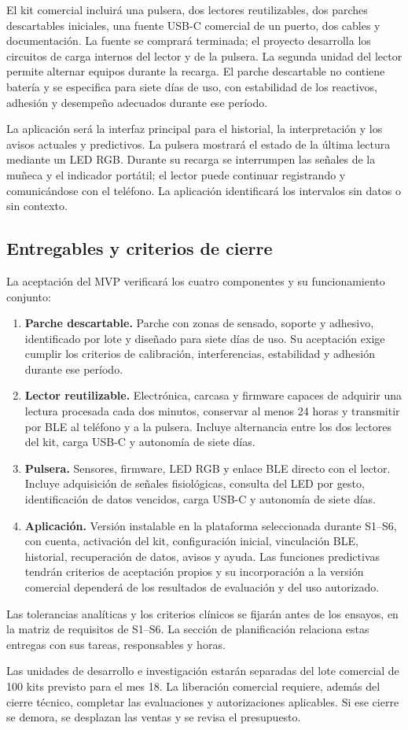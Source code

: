 El kit comercial incluirá una pulsera, dos lectores reutilizables, dos parches descartables iniciales, una fuente USB-C comercial de un puerto, dos cables y documentación. La fuente se comprará terminada; el proyecto desarrolla los circuitos de carga internos del lector y de la pulsera. La segunda unidad del lector permite alternar equipos durante la recarga. El parche descartable no contiene batería y se especifica para siete días de uso, con estabilidad de los reactivos, adhesión y desempeño adecuados durante ese período.

La aplicación será la interfaz principal para el historial, la interpretación y los avisos actuales y predictivos. La pulsera mostrará el estado de la última lectura mediante un LED RGB. Durante su recarga se interrumpen las señales de la muñeca y el indicador portátil; el lector puede continuar registrando y comunicándose con el teléfono. La aplicación identificará los intervalos sin datos o sin contexto.

\subsection{Entregables y criterios de cierre}
La aceptación del MVP verificará los cuatro componentes y su funcionamiento conjunto:
\begin{enumerate}
\item \textbf{Parche descartable.} Parche con zonas de sensado, soporte y adhesivo, identificado por lote y diseñado para siete días de uso. Su aceptación exige cumplir los criterios de calibración, interferencias, estabilidad y adhesión durante ese período.
\item \textbf{Lector reutilizable.} Electrónica, carcasa y firmware capaces de adquirir una lectura procesada cada dos minutos, conservar al menos 24 horas y transmitir por BLE al teléfono y a la pulsera. Incluye alternancia entre los dos lectores del kit, carga USB-C y autonomía de siete días.
\item \textbf{Pulsera.} Sensores, firmware, LED RGB y enlace BLE directo con el lector. Incluye adquisición de señales fisiológicas, consulta del LED por gesto, identificación de datos vencidos, carga USB-C y autonomía de siete días.
\item \textbf{Aplicación.} Versión instalable en la plataforma seleccionada durante S1--S6, con cuenta, activación del kit, configuración inicial, vinculación BLE, historial, recuperación de datos, avisos y ayuda. Las funciones predictivas tendrán criterios de aceptación propios y su incorporación a la versión comercial dependerá de los resultados de evaluación y del uso autorizado.
\end{enumerate}

Las tolerancias analíticas y los criterios clínicos se fijarán antes de los ensayos, en la matriz de requisitos de S1--S6. La sección de planificación relaciona estas entregas con sus tareas, responsables y horas.

Las unidades de desarrollo e investigación estarán separadas del lote comercial de 100 kits previsto para el mes 18. La liberación comercial requiere, además del cierre técnico, completar las evaluaciones y autorizaciones aplicables. Si ese cierre se demora, se desplazan las ventas y se revisa el presupuesto.
